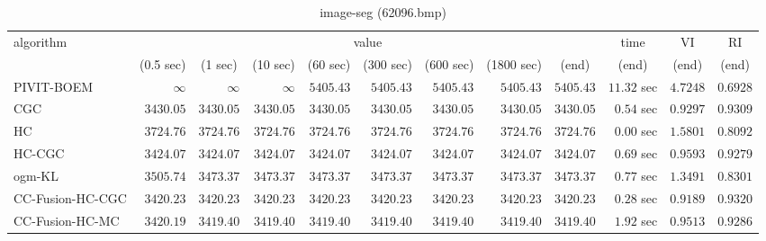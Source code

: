 \begin{table}[H]
\scriptsize
\centering
\caption{image-seg (62096.bmp)}
\label{tab:anytimetable-image-seg-62096.bmp}
\begin{tabular}{lrrrrrrrrrrr}
\toprule
           algorithm &                                   \multicolumn{8}{c}{value} & \multicolumn{1}{c}{time}    & \multicolumn{1}{c}{VI}  & \multicolumn{1}{c}{RI} \\  
\cmidrule(lr){2-9}\cmidrule(lr){10-10} \cmidrule(lr){11-11} \cmidrule(lr){12-12}   
                     & \multicolumn{1}{c}{(0.5 sec)} & \multicolumn{1}{c}{(1 sec)} & \multicolumn{1}{c}{(10 sec)} & \multicolumn{1}{c}{(60 sec)} & \multicolumn{1}{c}{(300 sec)} & \multicolumn{1}{c}{(600 sec)} & \multicolumn{1}{c}{(1800 sec)} & \multicolumn{1}{c}{(end)} & \multicolumn{1}{c}{(end)}    & \multicolumn{1}{c}{(end)}   & \multicolumn{1}{c}{(end)}  \\ \midrule 
          PIVIT-BOEM & $\infty$ & $\infty$ & $\infty$ & $      5405.43$ & $      5405.43$ & $      5405.43$ & $      5405.43$ & $      5405.43$ & $        11.32$ sec    & $       4.7248$  & $       0.6928$ \\ 
                 CGC & $      3430.05$ & $      3430.05$ & $      3430.05$ & $      3430.05$ & $      3430.05$ & $      3430.05$ & $      3430.05$ & $      3430.05$ & $         0.54$ sec    & $       0.9297$  & $       0.9309$ \\ 
                  HC & $      3724.76$ & $      3724.76$ & $      3724.76$ & $      3724.76$ & $      3724.76$ & $      3724.76$ & $      3724.76$ & $      3724.76$ & $         0.00$ sec    & $       1.5801$  & $       0.8092$ \\ 
              HC-CGC & $      3424.07$ & $      3424.07$ & $      3424.07$ & $      3424.07$ & $      3424.07$ & $      3424.07$ & $      3424.07$ & $      3424.07$ & $         0.69$ sec    & $       0.9593$  & $       0.9279$ \\ 
              ogm-KL & $      3505.74$ & $      3473.37$ & $      3473.37$ & $      3473.37$ & $      3473.37$ & $      3473.37$ & $      3473.37$ & $      3473.37$ & $         0.77$ sec    & $       1.3491$  & $       0.8301$ \\ 
    CC-Fusion-HC-CGC & $      3420.23$ & $      3420.23$ & $      3420.23$ & $      3420.23$ & $      3420.23$ & $      3420.23$ & $      3420.23$ & $      3420.23$ & $         0.28$ sec    & $       0.9189$  & $       0.9320$ \\ 
     CC-Fusion-HC-MC & $      3420.19$ & $      3419.40$ & $      3419.40$ & $      3419.40$ & $      3419.40$ & $      3419.40$ & $      3419.40$ & $      3419.40$ & $         1.92$ sec    & $       0.9513$  & $       0.9286$ \\ 

\end{tabular}
\end{table}
